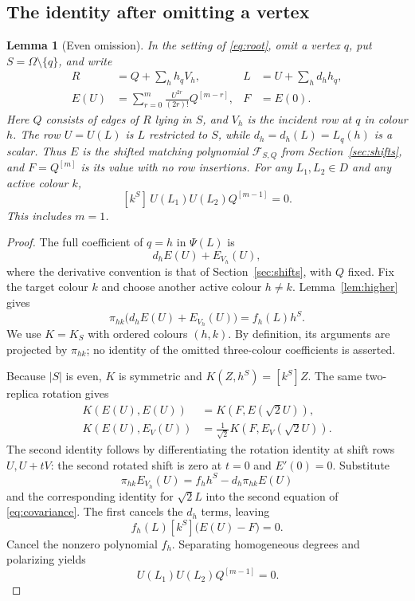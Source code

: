 \documentclass[11pt]{article}
\newtheorem{lemma}[theorem]{Lemma}
\theoremstyle{definition}
\theoremstyle{plain}
\numberwithin{equation}{section}
\begin{document}
\subsection{The identity after omitting a vertex}

\begin{lemma}[Even omission]\label{lem:omission}
In the setting of \eqref{eq:root}, omit a vertex \(q\), put
\(S=\Omega\setminus\{q\}\), and write
\[
 \begin{aligned}
 R&=Q+\sum_h h_q V_h,& L&=U+\sum_h d_hh_q,\\
 E(U)&=\sum_{r=0}^m\frac{U^{2r}}{(2r)!}Q^{[m-r]},&F&=E(0).
 \end{aligned}
\]
Here \(Q\) consists of edges of \(R\) lying in \(S\), and \(V_h\)
is the incident row at \(q\) in colour \(h\). The row \(U=U(L)\)
is \(L\) restricted to \(S\), while \(d_h=d_h(L)=L_q(h)\) is a scalar.
Thus \(E\) is the shifted matching polynomial \(\mathcal F_{S,Q}\)
from Section~\ref{sec:shifts}, and \(F=Q^{[m]}\) is its value with no
row insertions.
For any \(L_1,L_2\in D\) and any active colour \(k\),
\[
 [k^S]\,U(L_1)U(L_2)Q^{[m-1]}=0.
\]
This includes \(m=1\).
\end{lemma}

\begin{proof}
The full coefficient of \(q=h\) in \(\Psi(L)\) is
\[
 d_h E(U)+E_{V_h}(U),
\]
where the derivative convention is that of Section~\ref{sec:shifts},
with \(Q\) fixed. Fix the target colour \(k\) and choose another active
colour \(h\ne k\). Lemma~\ref{lem:higher} gives
\[
 \pi_{hk}\bigl(d_hE(U)+E_{V_h}(U)\bigr)=f_h(L)h^S.
\]
We use \(K=K_S\) with ordered colours \((h,k)\). By definition, its
arguments are projected by \(\pi_{hk}\); no identity of the omitted
three-colour coefficients is asserted.

Because \(|S|\) is even, \(K\) is symmetric and \(K(Z,h^S)=[k^S]Z\).
The same two-replica rotation gives
\begin{equation}
 \begin{aligned}
 K(E(U),E(U))&=K(F,E(\sqrt2U)),\\
 K(E(U),E_V(U))&=\frac{1}{\sqrt2}K(F,E_V(\sqrt2U)).
 \end{aligned}
 \tag{4}\label{eq:covariance}
\end{equation}
The second identity follows by differentiating the rotation identity at
shift rows \(U,U+tV\): the second rotated shift is zero at \(t=0\) and
\(E'(0)=0\). Substitute
\[
 \pi_{hk}E_{V_h}(U)=f_hh^S-d_h\pi_{hk}E(U)
\]
and the corresponding identity for \(\sqrt2L\) into the second equation
of \eqref{eq:covariance}. The first cancels the \(d_h\) terms, leaving
\[
 f_h(L)[k^S]\bigl(E(U)-F\bigr)=0.
\]
Cancel the nonzero polynomial \(f_h\). Separating homogeneous degrees and
polarizing yields
\begin{equation}
 [k^S]\,U(L_1)U(L_2)Q^{[m-1]}=0.
 \tag{5}\label{eq:omission}
\end{equation}
\end{proof}
\end{document}
